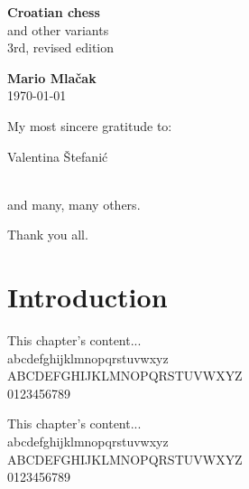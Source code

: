 \documentclass[b5paper,12pt,draft]{book}
\begin{document}
\thispagestyle{empty}
\vspace*{0.2\textheight}
\begin{center}
    \textbf{\Large{Croatian chess}} \\ [1.0em]
    \large{and other variants} \\ [1.0em]
    \small{3rd, revised edition} \\ [2.0cm]
    \vspace*{0.2\textheight}

    \textbf{\large{Mario Mlačak}} \\ [1.0em]
    \small{\today} %
\end{center}
\clearpage

\thispagestyle{empty}
\vspace*{0.1\textheight}
\clearpage

\thispagestyle{empty}
\vspace*{0.2\textheight}
\hfill{My most sincere gratitude to:}
\vspace*{1.0em}

\hfill{Valentina Štefanić} \\
\hspace*{\fill}{Kristina Mlačak} \\
\hspace*{\fill}{Slavko Štefanić}
\vspace*{1.0em}

\hfill{and many, many others.}
\vspace*{1.0em}

\hfill{Thank you all.}
\clearpage

\thispagestyle{empty}
\vspace*{0.1\textheight}
\clearpage

\section{Introduction}
\small{This chapter's content... \\
abcdefghijklmnopqrstuvwxyz \\
ABCDEFGHIJKLMNOPQRSTUVWXYZ \\
0123456789}

\tiny{This chapter's content... \\
abcdefghijklmnopqrstuvwxyz \\
ABCDEFGHIJKLMNOPQRSTUVWXYZ \\
0123456789}
\end{document}
